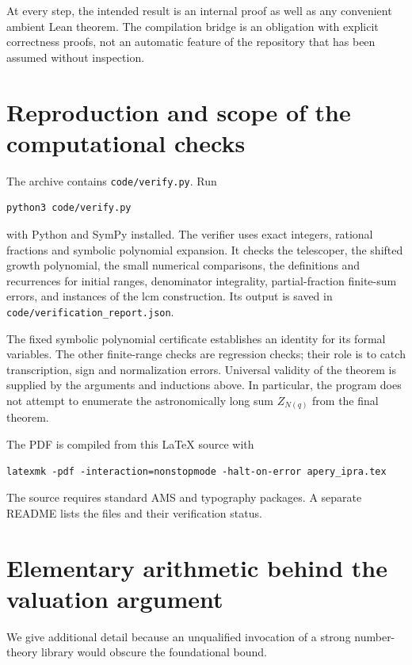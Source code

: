 \documentclass[11pt]{article}
\theoremstyle{definition}\newtheorem{definition}[theorem]{Definition}
\theoremstyle{remark}\newtheorem{remark}[theorem]{Remark}
\newcommand{\code}[1]{{\small\texttt{#1}}}
\begin{document}
At every step, the intended result is an internal proof as well as any
convenient ambient Lean theorem. The compilation bridge is an obligation
with explicit correctness proofs, not an automatic feature of the
repository that has been assumed without inspection.

\section{Reproduction and scope of the computational checks}\label{sec:checks}
The archive contains \code{code/verify.py}. Run
\begin{lstlisting}
python3 code/verify.py
\end{lstlisting}
with Python and SymPy installed. The verifier uses exact integers, rational
fractions and symbolic polynomial expansion. It checks the telescoper,
the shifted growth polynomial, the small numerical comparisons, the
definitions and recurrences for initial ranges, denominator integrality,
partial-fraction finite-sum errors, and instances of the lcm construction.
Its output is saved in \code{code/verification\_report.json}.

The fixed symbolic polynomial certificate establishes an identity for its
formal variables. The other finite-range checks are regression checks;
their role is to catch transcription, sign and normalization errors.
Universal validity of the theorem is supplied by the arguments and
inductions above. In particular, the program does not attempt to enumerate
the astronomically long sum $Z_{N(q)}$ from the final theorem.

The PDF is compiled from this \LaTeX{} source with
\begin{lstlisting}
latexmk -pdf -interaction=nonstopmode -halt-on-error apery_ipra.tex
\end{lstlisting}
The source requires standard AMS and typography packages. A separate
README lists the files and their verification status.

\appendix
\section{Elementary arithmetic behind the valuation argument}\label{app:arithmetic}
We give additional detail because an unqualified invocation of a strong
number-theory library would obscure the foundational bound.
\end{document}
